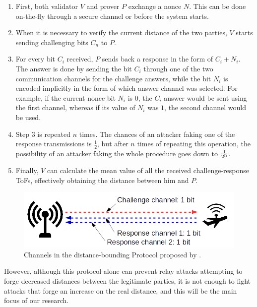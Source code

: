 \documentclass{article}
\begin{document}
\begin{enumerate}
  \item First, both validator $V$ and prover $P$ exchange a nonce $N$. This can be done on-the-fly through a secure channel or before the system starts.
  \item When it is necessary to verify the current distance of the two parties, $V$ starts sending challenging bits $C_{n}$ to $P$.
  \item For every bit $C_{i}$ received, $P$ sends back a response in the form of $C_{i}+N_{i}$. The answer is done by sending the bit $C_{i}$ through one of the two communication channels for the challenge answers, while the bit $N_{i}$ is encoded implicitly in the form of which answer channel was selected. For example, if the current nonce bit $N_{i}$ is $0$, the $C_{i}$ answer would be sent using the first channel, whereas if its value of $N_{i}$ was $1$, the second channel would be used.
  \item Step 3 is repeated $n$ times. The chances of an attacker faking one of the response transmissions is $\frac{1}{2}$, but after $n$ times of repeating this operation, the possibility of an attacker faking the whole procedure goes down to $\frac{1}{2\textsuperscript{n}}$. 
  \item Finally, $V$ can calculate the mean value of all the received challenge-response ToFs, effectively obtaining the distance between him and $P$.
\end{enumerate}




\begin{figure}[h!]
  \centering
    \includegraphics[width=1\textwidth]{images/dbounding.png}
  \caption{Channels in the distance-bounding Protocol proposed by \citeauthor{rasmussen2010realization} \cite{rasmussen2010realization}.}
  \label{fig:dbounding1}
\end{figure}



However, although this protocol alone can prevent relay attacks attempting to forge decreased distances between the legitimate parties, it is not enough to fight attacks that forge an increase on the real distance, and this will be the main focus of our research.\\
\end{document}
